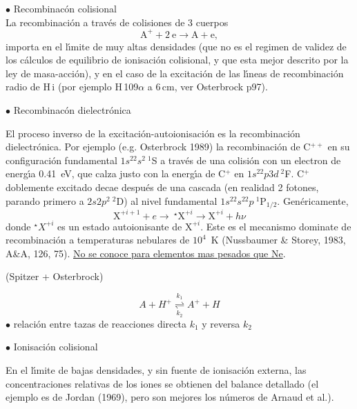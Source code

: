 
{$\bullet$ Recombinac\'on colisional} \\

La recombinaci\'on a trav\'es de colisiones de 3 cuerpos 
\[
 \mathrm{A^+} + 2~\mathrm{e}  \rightarrow \mathrm{A} + \mathrm{e}, 
\]
importa en el l\'{\i}mite de muy altas densidades (que no es el
regimen de validez de los c\'alculos de equilibrio de ionisaci\'on
colisional, y que esta mejor descrito por la ley de masa-acci\'on), y
en el caso de la excitaci\'on de las l\'{\i}neas de recombinaci\'on
radio de H\,{\sc i} (por ejemplo H\,109$\alpha$ a 6\,cm, ver
Osterbrock p97).


{$\bullet$ Recombinac\'on dielectr\'onica}

El proceso inverso de la excitaci\'on-autoionisaci\'on es la
recombinaci\'on dielectr\'onica. Por ejemplo (e.g. Osterbrock 1989) la
recombinaci\'on de C$^{++}$ en su configuraci\'on fundamental
$1s^22s^2~^1$S a trav\'es de una colisi\'on con un electron de
energ\'{\i}a 0.41~eV, que calza justo con la energ\'{\i}a de C$^+$ en
$1s^22p3d~^2$F. C$^{+}$ doblemente excitado decae despu\'es de una
cascada (en realidad 2 fotones, parando primero a $2s2p^2~^2$D) al nivel
fundamental $1s^22s^22p~^1$P$_{1/2}$.  Gen\'ericamente,
\[
\mathrm{X}^{+i+1} + e \rightarrow ~^{\star}\mathrm{X}^{+i} \rightarrow \mathrm{X}^{+i} + h\nu
\]
donde $^{\star}X^{+i}$ es un estado autoionisante de
$\mathrm{X}^{+i}$.  Este es el mecanismo dominate de recombinaci\'on a
temperaturas nebulares de $10^{4}$~K (Nussbaumer \& Storey, 1983,
A\&A, 126, 75). \underline{No se conoce para elementos mas pesados que
Ne}.


(Spitzer + Osterbrock) 

\[
A  + H^+  \overset{k_1}{\underset{k_2}{\rightleftharpoons}} A^+ + H
\]
{$\bullet$ relaci\'on entre tazas de reacciones directa $k_1$ y reversa $k_2$}



{$\bullet$ Ionisaci\'on colisional}

En el l\'{\i}mite de bajas densidades, y sin fuente de ionisaci\'on
externa, las concentraciones relativas de los iones se obtienen del
balance detallado (el ejemplo es de Jordan (1969), pero son mejores
los n\'umeros de Arnaud et al.). 

